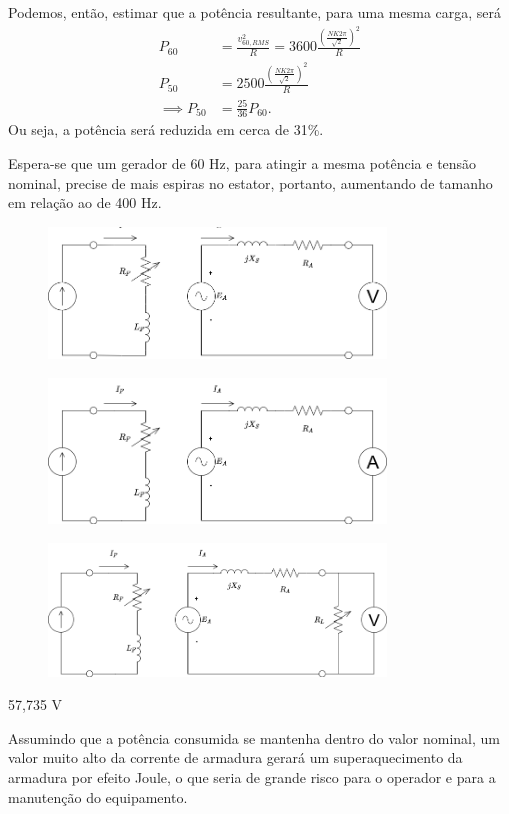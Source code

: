 \documentclass[a4paper]{report}
\begin{document}
Podemos, então, estimar que a potência resultante, para uma mesma carga, será
\begin{align*}
    P_{60} &= \frac{v_{60,RMS}^2}{R} = 3600\frac{\left( \frac{ N K 2\pi }{\sqrt{2} } \right) ^2}{R} \\
    P_{50} &= 2500\frac{\left( \frac{ N K 2\pi }{\sqrt{2} } \right) ^2}{R} \\
    \implies P_{50} &= \frac{25}{36} P_{60} 
.\end{align*}
Ou seja, a potência será reduzida em cerca de 31\%.


Espera-se que um gerador de 60 Hz, para atingir a mesma potência e tensão nominal, precise de mais espiras no estator, portanto, aumentando de tamanho em relação ao de 400 Hz.


\begin{figure}[H]
    \centering
    \includegraphics[width=0.8\textwidth]{figures/prelab1-8.png}
\end{figure}


\begin{figure}[H]
    \centering
    \includegraphics[width=0.8\textwidth]{figures/prelab1-9.png}
\end{figure}


\begin{figure}[H]
    \centering
    \includegraphics[width=0.8\textwidth]{figures/prelab1-10.png}
\end{figure}


57,735 V


Assumindo que a potência consumida se mantenha dentro do valor nominal, um valor muito alto da corrente de armadura gerará um superaquecimento da armadura por efeito Joule, o que seria de grande risco para o operador e para a manutenção do equipamento.
\end{document}
